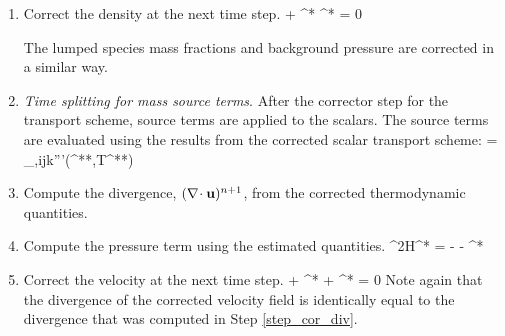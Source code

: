 \begin{enumerate}

\item Correct the density at the next time step.
\be
{} +  \nabla\!\cdot \rho^* \bu^* = 0
\ee

The lumped species mass fractions and background pressure are corrected in a similar way.

\item \emph{Time splitting for mass source terms}. After the corrector step for the transport scheme, source terms are applied to the scalars.  The source terms are evaluated using the results from the corrected scalar transport scheme:
\be
{} =  \dm_{\alpha,ijk}'''(^{**},T^{**})
\ee

\item \label{step_cor_div} Compute the divergence, $(\nabla\!\cdot {\bf u})^{n+1}$, from the corrected thermodynamic quantities.

\item Compute the pressure term using the estimated quantities.
\be
\label{eqn_corrector_poisson2}
\nabla^2{\cal H}^* = - 
   - \nabla\!\cdot {}^*
\ee

\item Correct the velocity at the next time step.
\be
{} + ^* + ^*  = 0
\ee
Note again that the divergence of the corrected velocity field is identically equal to the divergence that was computed in Step \ref{step_cor_div}.


\end{enumerate}

